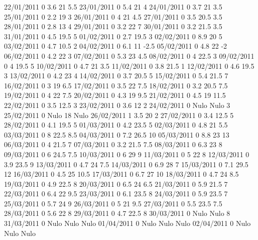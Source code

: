 22/01/2011  0      3.6    21     5.5 
23/01/2011  0      5.4    21     4 
24/01/2011  0      3.7    21     3.5 
25/01/2011  0      2.2    19     3 
26/01/2011  0      4      21     4.5 
27/01/2011  0      3.5    20.5   3.5 
28/01/2011  0      2.8    13     4 
29/01/2011  0      3.2    22     7 
30/01/2011  0      3.2    21.5   3.5 
31/01/2011  0      4.5    19.5   5 
01/02/2011  0      2.7    19.5   3 
02/02/2011  0      8.9    20     5 
03/02/2011  0      4.7    10.5   2 
04/02/2011  0      6.1    11    -2.5 
05/02/2011  0      4.8    22    -2 
06/02/2011  0      4.2    22     3 
07/02/2011  0      5.3    23     4.5 
08/02/2011  0      4      22.5   3 
09/02/2011  0      4      19.5   5 
10/02/2011  0      4.7    21     3.5 
11/02/2011  0      3.8    21.5   1 
12/02/2011  0      4.6    19.5   3 
13/02/2011  0      4.2    23     4 
14/02/2011  0      3.7    20.5   5 
15/02/2011  0      5.4    21.5   7 
16/02/2011  0      3      19     6.5 
17/02/2011  0      3.5    22     7.5 
18/02/2011  0      3.2    20.5   7.5 
19/02/2011  0      4      22     7.5 
20/02/2011  0      4.3    19     9.5 
21/02/2011  0      4.5    19     11.5 
22/02/2011  0      3.5    12.5   3 
23/02/2011  0      3.6    12     2 
24/02/2011  0     Nulo   Nulo    3 
25/02/2011  0     Nulo    18    Nulo
26/02/2011  1      3.5    20     2 
27/02/2011  0      3.4    12.5   5 
28/02/2011  0      4.1    19.5   5 
01/03/2011  0      4.2    23.5   5 
02/03/2011  0      4.8    21     5.5 
03/03/2011  0      8      22.5   8.5 
04/03/2011  0      7.2    26.5   10 
05/03/2011  0      8.8    23     13 
06/03/2011  0      4      21.5   7 
07/03/2011  0      3.2    21.5   7.5 
08/03/2011  0      6.3    23     8 
09/03/2011  0      6      24.5   7.5 
10/03/2011  0      6      29     9 
11/03/2011  0      5      22     8 
12/03/2011  0      3.9    23.5   9 
13/03/2011  0      4.7    24     7.5 
14/03/2011  0      6.9    28     7 
15/03/2011  0      7.1    29.5   12 
16/03/2011  0      4.5    25     10.5 
17/03/2011  0      6.7    27     10 
18/03/2011  0      4.7    24     8.5 
19/03/2011  0      4.9    22.5   8 
20/03/2011  0      6.5    24     6.5 
21/03/2011  0      5.9    21.5   7 
22/03/2011  0      6.4    22     9.5 
23/03/2011  0      6.1    23.5   8 
24/03/2011  0      5.9    23.5   7 
25/03/2011  0      5.7    24     9 
26/03/2011  0      5      21     9.5 
27/03/2011  0      5.5    23.5   7.5 
28/03/2011  0      5.6    22     8 
29/03/2011  0      4.7    22.5   8 
30/03/2011  0     Nulo   Nulo    8 
31/03/2011  0     Nulo   Nulo   Nulo
01/04/2011  0     Nulo   Nulo   Nulo
02/04/2011  0     Nulo   Nulo   Nulo
